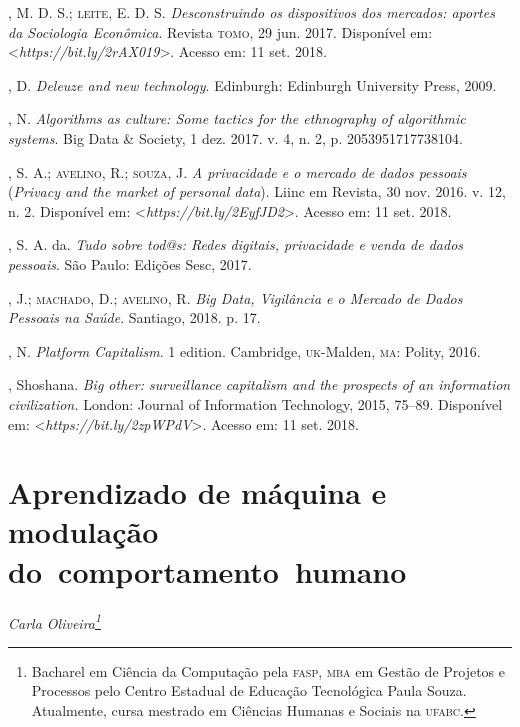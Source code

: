 \begin{bibliohedra}
, M. D. S.; \textsc{leite}, E. D. S. \emph{Desconstruindo os
dispositivos dos mercados: aportes da Sociologia Econômica}. Revista
\textsc{tomo}, 29 jun. 2017. Disponível em: \textless{}\emph{https://bit.ly/2rAX019}\textgreater{}. Acesso em: 11 set. 2018.

, D. \emph{Deleuze and new technology}. Edinburgh: Edinburgh
University Press, 2009.

, N. \emph{Algorithms as culture: Some tactics for the
ethnography of algorithmic systems}. Big Data \& Society, 1 dez. 2017. v.
4, n. 2, p. 2053951717738104.

, S. A.; \textsc{avelino}, R.; \textsc{souza}, J. \emph{A privacidade e o
mercado de dados pessoais} (\emph{Privacy and the market of personal
data}). Liinc em Revista, 30 nov. 2016. v. 12, n. 2. Disponível em:
\textless{}\emph{https://bit.ly/2EyfJD2}\textgreater{}. Acesso em: 11 set. 2018.

, S. A. da. \emph{Tudo sobre tod@s: Redes digitais,
privacidade e venda de dados pessoais}. São Paulo: Edições Sesc, 2017.

, J.; \textsc{machado}, D.; \textsc{avelino}, R. \emph{Big Data, Vigilância e o
Mercado de Dados Pessoais na Saúde}. Santiago, 2018. p. 17.

, N. \emph{Platform Capitalism}. 1 edition. Cambridge, \textsc{uk}-Malden,
\textsc{ma}: Polity, 2016.

, Shoshana. \emph{Big other: surveillance capitalism and the
prospects of an information civilization.} London: Journal of
Information Technology, 2015, 75--89. Disponível em: \textless{}\emph{https://bit.ly/2zpWPdV}\textgreater{}. Acesso em: 11 set. 2018.
\end{bibliohedra}


\chapter*{Aprendizado de máquina e modulação do~comportamento~humano}


\begin{flushright}
\emph{Carla Oliveira\footnote{Bacharel em Ciência da Computação pela \textsc{fasp}, \textsc{mba} em Gestão de Projetos e Processos pelo Centro Estadual de Educação Tecnológica Paula Souza. Atualmente, cursa mestrado em Ciências Humanas e Sociais na \textsc{ufabc}.}}
\end{flushright}

